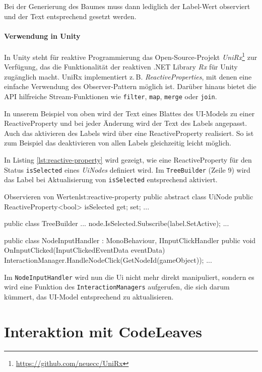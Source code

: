Bei der Generierung des Baumes muss dann lediglich der Label-Wert observiert und der Text entsprechend gesetzt werden.

\subsubsection*{Verwendung in Unity}

In Unity steht für reaktive Programmierung das Open-Source-Projekt \textit{UniRx}\footnote{\url{https://github.com/neuecc/UniRx}} zur Verfügung, das die Funktionalität der reaktiven .NET Library \textit{Rx} für Unity zugänglich macht. UniRx implementiert z.\,B. \textit{ReactiveProperties}, mit denen eine einfache Verwendung des Observer-Pattern möglich ist. Darüber hinaus bietet die API hilfreiche Stream-Funktionen wie \texttt{filter}, \texttt{map}, \texttt{merge} oder \texttt{join}.

In unserem Beispiel von oben wird der Text eines Blattes des UI-Models zu einer ReactiveProperty und bei jeder Änderung wird der Text des Labels angepasst. Auch das aktivieren des Labels wird über eine ReactiveProperty realisiert. So ist zum Beispiel das deaktivieren von allen Labels gleichzeitig leicht möglich.

In Listing \ref{lst:reactive-property} wird gezeigt, wie eine ReactiveProperty für den Status \texttt{isSelected} eines \textit{UiNodes} definiert wird. Im \texttt{TreeBuilder} (Zeile 9) wird das Label bei Aktualisierung von \texttt{isSelected} entsprechend aktiviert.

\begin{codesnippet}{Observieren von Werten}{lst:reactive-property}
public abstract class UiNode
{
    public ReactiveProperty<bool> isSelected { get; set; }
    ...
}

public class TreeBuilder {
    ...
    node.IsSelected.Subscribe(label.SetActive);
    ...
}

public class NodeInputHandler : MonoBehaviour, IInputClickHandler
{
    public void OnInputClicked(InputClickedEventData eventData)
    {
        InteractionManager.HandleNodeClick(GetNodeId(gameObject));
    }
    ...
}
\end{codesnippet}

Im \texttt{NodeInputHandler} wird nun die Ui nicht mehr direkt manipuliert, sondern es wird eine Funktion des \texttt{InteractionManagers} aufgerufen, die sich darum kümmert, das UI-Model entsprechend zu aktualisieren.

\chapter{Interaktion mit CodeLeaves}
\label{ch:interaction}

